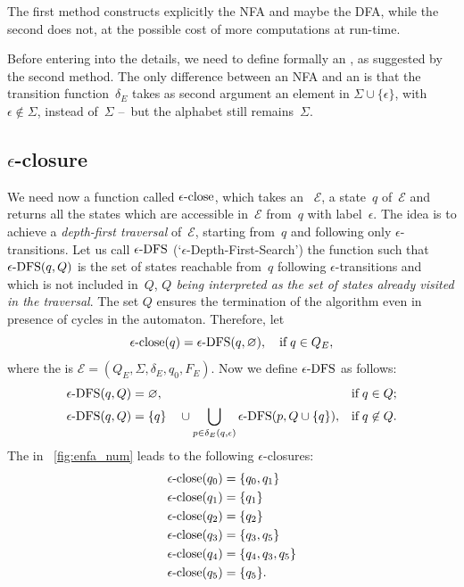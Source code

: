 The first method constructs explicitly the NFA and maybe the DFA,
while the second does not, at the possible cost of more computations
at run-time.

Before entering into the details, we need to define formally an \eNFA,
as suggested by the second method. The only difference between an NFA
and an \eNFA is that the transition function~\(\delta_E\) takes as
second argument an element in \(\Sigma \cup \{\epsilon\}\), with
\(\epsilon \not\in \Sigma\), instead of~\(\Sigma\) --~but the alphabet
still remains~\(\Sigma\).

\subsection*{$\epsilon$-closure}

We need now a function called \emph{\(\epsilon\text{-close}\)}, which takes an
\eNFA~\(\mathcal{E}\), a state~\(q\) of~\(\mathcal{E}\) and returns
all the states which are accessible in~\(\mathcal{E}\) from~\(q\) with
label~\(\epsilon\). The idea is to achieve a \emph{depth-first
  traversal} of~\(\mathcal{E}\), starting from~\(q\) and following
only \(\epsilon\)-transitions. Let us call \(\epsilon\text{-DFS}\)
(`\(\epsilon\)-Depth-First-Search') the function such that \(\epsilon\text{-DFS}(q,
Q)\) is the set of states reachable from~\(q\) following
\(\epsilon\)-transitions and which is not included in~\(Q\),
\emph{\(Q\) being interpreted as the set of states already visited in
  the traversal}. The set \(Q\) ensures the termination of the
algorithm even in presence of cycles in the automaton. Therefore, let
\begin{equation*}
\epsilon\text{-close} (q) = \epsilon\text{-DFS} (q, \varnothing), \quad \text{if} \; q \in Q_E,
\end{equation*}
where the \eNFA is \(\mathcal{E} = (Q_E, \Sigma, \delta_E, q_0,
F_E)\). Now we define \(\epsilon\text{-DFS}\) as follows:
\begin{align}
   \epsilon\text{-DFS} (q, Q)
&= \varnothing,
& \text{if} \; q \in Q; \label{eDFS_1}\\
  \epsilon\text{-DFS} (q, Q)
&= \{q\} \quad \cup \bigcup_{p \in \delta_E(q,\epsilon)}{\epsilon\text{-DFS} (p, Q
    \cup \{q\})},
& \text{if} \; q \not\in Q. \label{eDFS_2}
\end{align}
The \eNFA in \fig~\vref{fig:enfa_num} leads to the following
\(\epsilon\)-closures:
\begin{align*}
    \epsilon\text{-close} (q_0) &= \{q_0, q_1\}\\
    \epsilon\text{-close} (q_1) &= \{q_1\}\\
    \epsilon\text{-close} (q_2) &= \{q_2\}\\
    \epsilon\text{-close} (q_3) &= \{q_3, q_5\}\\
    \epsilon\text{-close} (q_4) &= \{q_4, q_3, q_5\} \\
    \epsilon\text{-close} (q_5) &= \{q_5\}.
\end{align*}

